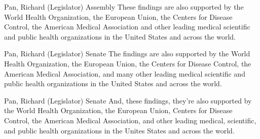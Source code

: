 \begin{result}{12.629606480874958}{Pan, Richard (Legislator) Assembly}
These findings are also supported by the World Health Organization, the European Union, the Centers for Disease Control, the American Medical Association and other leading medical scientific and public health organizations in the United States and across the world.
\end{result}

\begin{result}{12.541612236441622}{Pan, Richard (Legislator) Senate}
The findings are also supported by the World Health Organization, the European Union, the Centers for Disease Control, the American Medical Association, and many other leading medical scientific and public health organizations in the United States and across the world.
\end{result}

\begin{result}{12.433328837184881}{Pan, Richard (Legislator) Senate}
And, these findings, they're also supported by the World Health Organization, the European Union, Centers for Disease Control, the American Medical Association, and other leading medical, scientific, and public health organizations in the Unites States and across the world.
\end{result}

